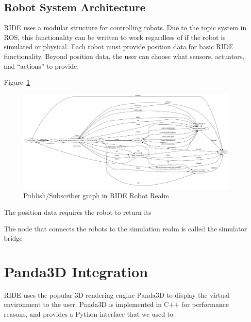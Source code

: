 \subsection{Robot System Architecture}
\label{section:robot-architecture}
RIDE uses a modular structure for controlling robots. Due to the topic system in ROS, this functionality can be written to work regardless of if the robot is simulated or physical. Each robot must provide position data for basic RIDE functionality. Beyond position data, the user can choose what sensors, actuators, and ``actions'' to provide.

Figure~\ref{fig:ride-robot-realm}

\begin{figure}[ht]
\includegraphics[width=\textwidth]{images/ride-robot-realm.png}
\caption{Publish/Subscriber graph in RIDE Robot Realm\label{fig:ride-robot-realm}}
\end{figure}

The position data requires the robot to return its

The node that connects the robots to the simulation realm is called the simulator bridge

\section{Panda3D Integration}

RIDE uses the popular 3D rendering engine Panda3D to display the virtual environment to the user. Panda3D is implemented in C++ for performance reasons, and provides a Python interface that we used to